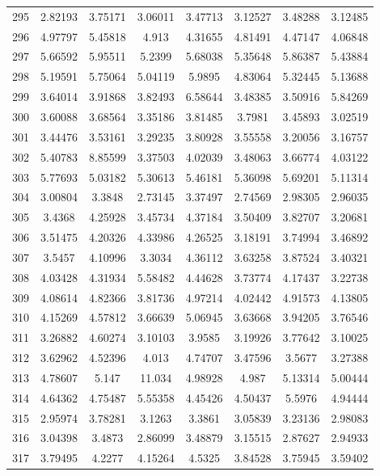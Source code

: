 \begin{center}
\begin{longtable}{cccccccc}
295 & 2.82193 & 3.75171 & 3.06011 & 3.47713 & 3.12527 & 3.48288 & 3.12485\\
296 & 4.97797 & 5.45818 & 4.913 & 4.31655 & 4.81491 & 4.47147 & 4.06848\\
297 & 5.66592 & 5.95511 & 5.2399 & 5.68038 & 5.35648 & 5.86387 & 5.43884\\
298 & 5.19591 & 5.75064 & 5.04119 & 5.9895 & 4.83064 & 5.32445 & 5.13688\\
299 & 3.64014 & 3.91868 & 3.82493 & 6.58644 & 3.48385 & 3.50916 & 5.84269\\
300 & 3.60088 & 3.68564 & 3.35186 & 3.81485 & 3.7981 & 3.45893 & 3.02519\\
301 & 3.44476 & 3.53161 & 3.29235 & 3.80928 & 3.55558 & 3.20056 & 3.16757\\
302 & 5.40783 & 8.85599 & 3.37503 & 4.02039 & 3.48063 & 3.66774 & 4.03122\\
303 & 5.77693 & 5.03182 & 5.30613 & 5.46181 & 5.36098 & 5.69201 & 5.11314\\
304 & 3.00804 & 3.3848 & 2.73145 & 3.37497 & 2.74569 & 2.98305 & 2.96035\\
305 & 3.4368 & 4.25928 & 3.45734 & 4.37184 & 3.50409 & 3.82707 & 3.20681\\
306 & 3.51475 & 4.20326 & 4.33986 & 4.26525 & 3.18191 & 3.74994 & 3.46892\\
307 & 3.5457 & 4.10996 & 3.3034 & 4.36112 & 3.63258 & 3.87524 & 3.40321\\
308 & 4.03428 & 4.31934 & 5.58482 & 4.44628 & 3.73774 & 4.17437 & 3.22738\\
309 & 4.08614 & 4.82366 & 3.81736 & 4.97214 & 4.02442 & 4.91573 & 4.13805\\
310 & 4.15269 & 4.57812 & 3.66639 & 5.06945 & 3.63668 & 3.94205 & 3.76546\\
311 & 3.26882 & 4.60274 & 3.10103 & 3.9585 & 3.19926 & 3.77642 & 3.10025\\
312 & 3.62962 & 4.52396 & 4.013 & 4.74707 & 3.47596 & 3.5677 & 3.27388\\
313 & 4.78607 & 5.147 & 11.034 & 4.98928 & 4.987 & 5.13314 & 5.00444\\
314 & 4.64362 & 4.75487 & 5.55358 & 4.45426 & 4.50437 & 5.5976 & 4.94444\\
315 & 2.95974 & 3.78281 & 3.1263 & 3.3861 & 3.05839 & 3.23136 & 2.98083\\
316 & 3.04398 & 3.4873 & 2.86099 & 3.48879 & 3.15515 & 2.87627 & 2.94933\\
317 & 3.79495 & 4.2277 & 4.15264 & 4.5325 & 3.84528 & 3.75945 & 3.59402\\

\end{longtable}
\end{center}
